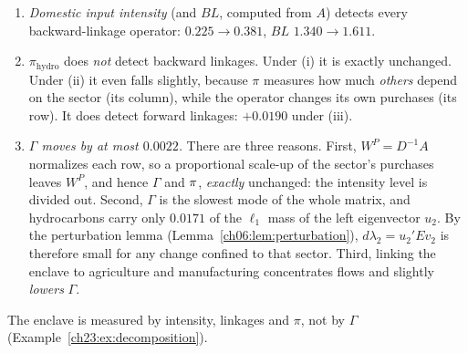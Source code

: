 \documentclass[../solutions_manual.tex]{subfiles}
\begin{document}
\begin{enumerate}
\item \emph{Domestic input intensity} (and $BL$, computed from $A$) detects every backward-linkage operator: $0.225 \to 0.381$, $BL$ $1.340 \to 1.611$.
\item \emph{$\pi_{\text{hydro}}$} does \emph{not} detect backward linkages. Under (i) it is exactly unchanged. Under (ii) it even falls slightly, because $\pi$ measures how much \emph{others} depend on the sector (its column), while the operator changes its own purchases (its row). It does detect forward linkages: $+0.0190$ under (iii).
\item \emph{$\Gamma$ moves by at most $0.0022$.} There are three reasons. First, $W^P = D^{-1}A$ normalizes each row, so a proportional scale-up of the sector's purchases leaves $W^P$, and hence $\Gamma$ and $\pi$, \emph{exactly} unchanged: the intensity level is divided out. Second, $\Gamma$ is the slowest mode of the whole matrix, and hydrocarbons carry only $0.0171$ of the $\ell_1$ mass of the left eigenvector $u_2$. By the perturbation lemma (Lemma~\ref{ch06:lem:perturbation}), $d\lambda_2 = u_2'Ev_2$ is therefore small for any change confined to that sector. Third, linking the enclave to agriculture and manufacturing concentrates flows and slightly \emph{lowers} $\Gamma$.
\end{enumerate}
The enclave is measured by intensity, linkages and $\pi$, not by $\Gamma$ (Example~\ref{ch23:ex:decomposition}).

\end{document}
